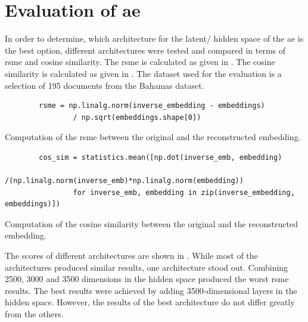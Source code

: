 \section{Evaluation of \ac{ae}}\label{sec:evaluation-ae}

In order to determine, which architecture for the latent/ hidden space of the \ac{ae} is the best option, 
different architectures were tested and compared in terms of \ac{rsme} and cosine similarity.
The \ac{rsme} is calculated as given in .
The cosine similarity is calculated as given in .
The dataset used for the evaluation is a selection of 195 documents from the Bahamas dataset.

\begin{listing}[htp]
    \begin{verbatim}
        rsme = np.linalg.norm(inverse_embedding - embeddings) 
                / np.sqrt(embeddings.shape[0])
    \end{verbatim}
    \caption{
        Computation of the \ac{rsme} between the original and the reconstructed embedding.
    }
    \label{lst:impl-rsme}
\end{listing}

\begin{listing}[htp]
    \begin{verbatim}
        cos_sim = statistics.mean([np.dot(inverse_emb, embedding)
                /(np.linalg.norm(inverse_emb)*np.linalg.norm(embedding)) 
                for inverse_emb, embedding in zip(inverse_embedding, embeddings)])
    \end{verbatim}
    \caption{
        Computation of the cosine similarity between the original and the reconstructed embedding.
    }
    \label{lst:impl-cos_sim}
\end{listing}

The scores of different architectures are shown in .
While most of the architectures produced similar results, one architecture stood out.
Combining 2500, 3000 and 3500 dimensions in the hidden space produced the worst \ac{rsme} results.
The best results were achieved by adding 3500-dimensional layers in the hidden space.
However, the results of the best architecture do not differ greatly from the others.

